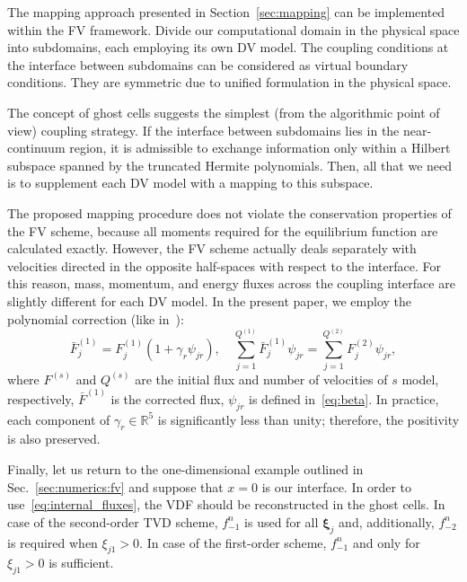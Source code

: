 \documentclass[]{elsarticle} %
\newcommand{\bxi}{\boldsymbol{\xi}}
\begin{document}
The mapping approach presented in Section~\ref{sec:mapping} can be implemented within the FV framework.
Divide our computational domain in the physical space into subdomains, each employing its own DV model.
The coupling conditions at the interface between subdomains can be considered as virtual boundary conditions.
They are symmetric due to unified formulation in the physical space.

The concept of ghost cells suggests the simplest (from the algorithmic point of view) coupling strategy.
If the interface between subdomains lies in the near-continuum region,
it is admissible to exchange information only within a Hilbert subspace
spanned by the truncated Hermite polynomials.
Then, all that we need is to supplement each DV model with a mapping to this subspace.

The proposed mapping procedure does not violate the conservation properties of the FV scheme,
because all moments required for the equilibrium function are calculated exactly.
However, the FV scheme actually deals separately with velocities
directed in the opposite half-spaces with respect to the interface.
For this reason, mass, momentum, and energy fluxes across the coupling interface
are slightly different  for each DV model.
In the present paper, we employ the polynomial correction (like in~\cite{Aristov1980}):
\begin{equation}\label{eq:poly_correction}
    \bar{F}^{(1)}_j = F^{(1)}_j(1+\gamma_r\psi_{j r}), \quad
    \sum_{j=1}^{Q^{(1)}} \bar{F}^{(1)}_j\psi_{j r} = \sum_{j=1}^{Q^{(2)}} F^{(2)}_j\psi_{j r},
\end{equation}
where \(F^{(s)}\) and \(Q^{(s)}\) are the initial flux and number of velocities of \(s\) model, respectively,
\(\bar{F}^{(1)}\) is the corrected flux, \(\psi_{j r}\) is defined in~\eqref{eq:beta}.
In practice, each component of \(\gamma_r\in\mathbb{R}^5\) is significantly less than unity;
therefore, the positivity is also preserved.

Finally, let us return to the one-dimensional example outlined in Sec.~\ref{sec:numerics:fv}
and suppose that \(x=0\) is our interface.
In order to use~\eqref{eq:internal_fluxes}, the VDF should be reconstructed in the ghost cells.
In case of the second-order TVD scheme, \(f_{-1}^n\) is used for all \(\bxi_j\) and, additionally,
\(f_{-2}^n\) is required when \(\xi_{j1}>0\).
In case of the first-order scheme, \(f_{-1}^n\) and only for \(\xi_{j1}>0\) is sufficient.
\end{document}

